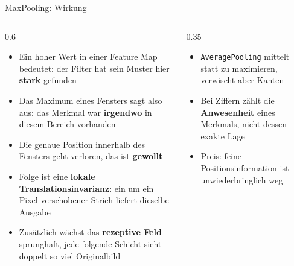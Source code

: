 \begin{frame}{MaxPooling: Wirkung}
\small
\begin{columns}
\begin{column}{0.6\linewidth}
\begin{itemize}
  \item Ein hoher Wert in einer Feature Map bedeutet: der Filter hat sein Muster hier \textbf{stark} gefunden
  \item Das Maximum eines Fensters sagt also aus: das Merkmal war \textbf{irgendwo} in diesem Bereich vorhanden
  \item Die genaue Position innerhalb des Fensters geht verloren, das ist \textbf{gewollt}
  \item Folge ist eine \textbf{lokale Translationsinvarianz}: ein um ein Pixel verschobener Strich liefert dieselbe Ausgabe
  \item Zusätzlich wächst das \textbf{rezeptive Feld} sprunghaft, jede folgende Schicht sieht doppelt so viel Originalbild
\end{itemize}
\end{column}
\begin{column}{0.35\linewidth}
\begin{itemize}
  \item \texttt{AveragePooling} mittelt statt zu maximieren, verwischt aber Kanten
  \item Bei Ziffern zählt die \textbf{Anwesenheit} eines Merkmals, nicht dessen exakte Lage
  \item Preis: feine Positionsinformation ist unwiederbringlich weg
\end{itemize}
\end{column}
\end{columns}
\end{frame}


\makequizpage{\QUIZURL}{\QUIZQRCODE}{\QUIZIMAGE}
\makequestionspage{\FRAGENIMAGE}

